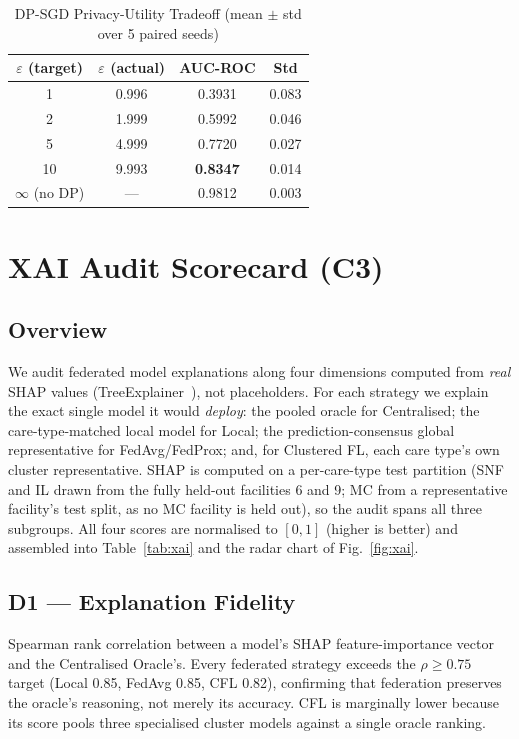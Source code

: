 \documentclass[journal]{IEEEtran}
\begin{document}
\begin{table}[!t]
\caption{DP-SGD Privacy-Utility Tradeoff (mean $\pm$ std over 5 paired seeds)}
\label{tab:dp_sweep}
\centering
\begin{tabular}{@{}cccc@{}}
\toprule
$\varepsilon$ (target) & $\varepsilon$ (actual) & AUC-ROC & Std \\
\midrule
1    & 0.996 & 0.3931 & 0.083 \\
2    & 1.999 & 0.5992 & 0.046 \\
5    & 4.999 & 0.7720 & 0.027 \\
10   & 9.993 & \textbf{0.8347} & 0.014 \\
$\infty$ (no DP) & --- & 0.9812 & 0.003 \\
\bottomrule
\end{tabular}
\end{table}

\section{XAI Audit Scorecard (C3)}
\label{sec:xai}

\subsection{Overview}
We audit federated model explanations along four dimensions computed from
\emph{real} SHAP values (TreeExplainer~\cite{lundberg2017}), not placeholders.
For each strategy we explain the exact single model it would \emph{deploy}: the
pooled oracle for Centralised; the care-type-matched local model for Local; the
prediction-consensus global representative for FedAvg/FedProx; and, for
Clustered FL, each care type's own cluster representative. SHAP is computed on a
per-care-type test partition (SNF and IL drawn from the fully held-out facilities
6 and 9; MC from a representative facility's test split, as no MC facility is held
out), so the audit spans all three subgroups. All four scores are normalised to
$[0,1]$ (higher is better) and assembled into Table~\ref{tab:xai} and the radar
chart of Fig.~\ref{fig:xai}.

\subsection{D1 — Explanation Fidelity}
Spearman rank correlation between a model's SHAP feature-importance vector and
the Centralised Oracle's. Every federated strategy exceeds the
$\rho \geq 0.75$ target (Local 0.85, FedAvg 0.85, CFL 0.82), confirming that
federation preserves the oracle's reasoning, not merely its accuracy. CFL is
marginally lower because its score pools three specialised cluster models against
a single oracle ranking.
\end{document}
